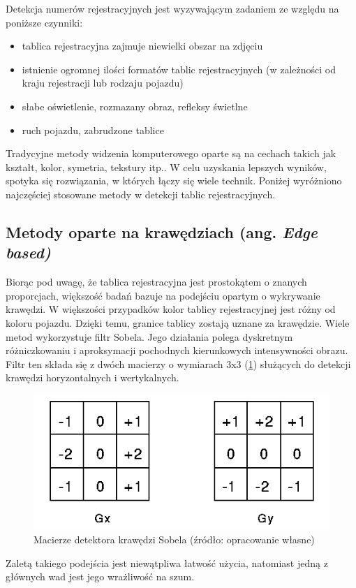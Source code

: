 Detekcja numerów rejestracyjnych jest wyzywającym zadaniem ze względu na poniższe czynniki:
\begin{itemize}
    \item tablica rejestracyjna zajmuje niewielki obszar na zdjęciu
    \item istnienie ogromnej ilości formatów tablic rejestracyjnych (w zależności od kraju rejestracji lub rodzaju pojazdu)
    \item słabe oświetlenie, rozmazany obraz, refleksy świetlne
    \item ruch pojazdu, zabrudzone tablice
\end{itemize}
Tradycyjne metody widzenia komputerowego oparte są na cechach takich jak kształt, kolor, symetria, tekstury itp.\cite{9310202}.
W celu uzyskania lepszych wyników, spotyka się rozwiązania, w których łączy się wiele technik.
Poniżej wyróżniono najczęściej stosowane metody w detekcji tablic rejestracyjnych.

\subsection{Metody oparte na krawędziach (ang. \textit{Edge based)}}
Biorąc pod uwagę, że tablica rejestracyjna jest prostokątem o znanych proporcjach, większość badań bazuje na podejściu opartym o wykrywanie krawędzi.
W większości przypadków kolor tablicy rejestracyjnej jest różny od koloru pojazdu.
Dzięki temu, granice tablicy zostają uznane za krawędzie.
Wiele metod wykorzystuje filtr Sobela.
Jego działania polega dyskretnym różniczkowaniu i aproksymacji pochodnych kierunkowych intensywności obrazu.
Filtr ten składa się z dwóch macierzy o wymiarach 3x3 (\ref{fig:sobel_filter}) służących do detekcji krawędzi horyzontalnych i wertykalnych.
\FloatBarrier
\begin{figure}[!ht]
    \centering
    \includegraphics[scale=0.6]{Pictures/sobel_filter}
    \caption{Macierze detektora krawędzi Sobela (źródło: opracowanie własne)}
    \label{fig:sobel_filter}
\end{figure}
\FloatBarrier
Zaletą takiego podejścia jest niewątpliwa łatwość użycia, natomiast jedną z głównych wad jest jego wrażliwość na szum.

